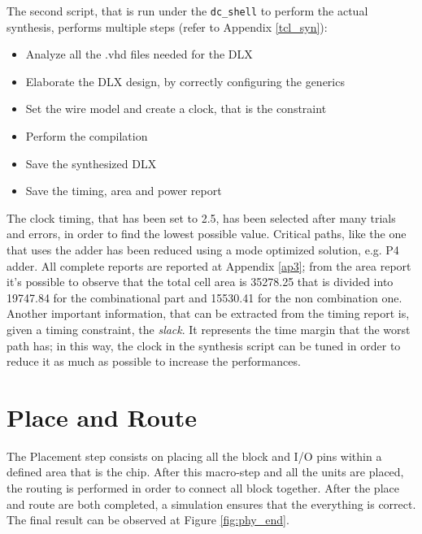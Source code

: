 The second script, that is run under the \texttt{dc\_shell} to perform the actual synthesis, performs multiple steps (refer to Appendix \ref{tcl_syn}):
\begin{itemize}
	\itemsep0sp
	\item Analyze all the .vhd files needed for the DLX
	\item Elaborate the DLX design, by correctly configuring the generics
	\item Set the wire model and create a clock, that is the constraint
	\item Perform the compilation
	\item Save the synthesized DLX
	\item Save the timing, area and power report 
\end{itemize}
The clock timing, that has been set to 2.5, has been selected after many trials and errors, in order to find the lowest possible value. Critical paths, like the one that uses the adder has been reduced using a mode optimized solution, e.g. P4 adder.\newline\newline
All complete reports are reported at Appendix \ref{ap3}; from the area report it's possible to observe that the total cell area is 35278.25 that is divided into 19747.84 for the combinational part and 15530.41 for the non combination one.\newline\newline
Another important information, that can be extracted from the timing report is, given a timing constraint, the \textit{slack}. It represents the time margin that the worst path has; in this way, the clock in the synthesis script can be tuned in order to reduce it as much as possible to increase the performances.

\section{Place and Route}
The Placement step consists on placing all the block and I/O pins within a defined area that is the chip. After this macro-step and all the units are placed, the routing is performed in order to connect all block together. After the place and route are both completed, a simulation ensures that the everything is correct. The final result can be observed at Figure \ref{fig:phy_end}.


